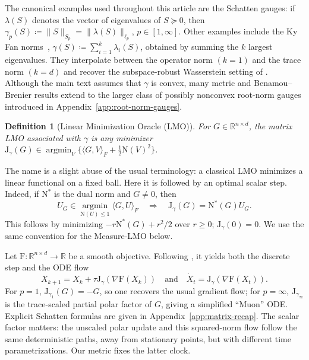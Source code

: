 \documentclass{article}
\newtheorem{definition}[theorem]{Definition}
\newcommand{\R}{\mathbb{R}}
\newcommand{\mF}{\mathrm{F}}
\newcommand{\mN}{\mathrm{N}}
\newcommand{\mJ}{\mathrm{J}}
\begin{document}
The canonical examples used throughout this article are the Schatten gauges: if $\lambda(S)$ denotes the vector of eigenvalues of $S\succeq 0$, then $\gamma_p(S)\coloneqq \|S\|_{S_p}=\|\lambda(S)\|_{\ell_p}$, $p\in[1,\infty]$.
%
Other examples include the Ky Fan norms~\citep{fan1951maximum},
$\gamma(S)\coloneqq \sum_{i=1}^k \lambda_i(S)$, obtained by summing the $k$
largest eigenvalues. They interpolate between the operator norm $(k=1)$ and
the trace norm $(k=d)$ and recover the subspace-robust Wasserstein setting of
\citet{PatyCuturi2019}. Although the main text assumes that $\gamma$ is convex,
many metric and Benamou--Brenier results extend to the larger class of possibly
nonconvex root-norm gauges introduced in
Appendix~\ref{app:root-norm-gauges}.


\begin{definition}[Linear Minimization Oracle (LMO)]
\label{def:matrix-lmo}
For $G\in\R^{n\times d}$, the matrix LMO associated with $\gamma$ is any minimizer
$\mJ_\gamma(G)\in\operatorname*{argmin}_{V}
\{\langle G,V\rangle_F+\frac12\mN(V)^2\}$.
\end{definition}

The name is a slight abuse of the usual terminology: a classical LMO minimizes
a linear functional on a fixed ball. Here it is followed by an optimal scalar
step. Indeed, if $\mN^*$ is the dual norm and $G\ne0$, then
\begin{equation}\label{eq:lmo-unit-ball}
 U_G\in\operatorname*{argmin}_{\mN(U)\le1}\langle G,U\rangle_F
 \quad\Longrightarrow\quad
 \mJ_\gamma(G)=\mN^*(G)U_G.
\end{equation}
This follows by minimizing $-r\mN^*(G)+r^2/2$ over $r\ge0$;
$\mJ_\gamma(0)=0$. We use the same convention for the Measure-LMO below.

Let $\mF:\R^{n\times d}\to\R$ be a smooth objective.
Following \citet{PethickXieAntonakopoulosEtAl2025}, it yields both the discrete step and the ODE flow
\begin{equation}\label{eq:ode-basic}
	X_{k+1}=X_k+\tau\mJ_\gamma(\nabla\mF(X_k))
	\quad\text{and}\quad
	\dot X_t=\mJ_\gamma(\nabla\mF(X_t)).
\end{equation}
For $p=1$, $\mJ_{\gamma_1}(G)=-G$, so one recovers the usual gradient flow;
for $p=\infty$, $\mJ_{\gamma_\infty}$ is the trace-scaled partial polar factor
of $G$, giving a simplified ``Muon'' ODE. Explicit Schatten formulas are
given in Appendix~\ref{app:matrix-recap}.
The scalar factor matters: the unscaled polar update and this squared-norm
flow follow the same deterministic paths, away from stationary points, but
with different time parametrizations. Our metric fixes the latter clock.
\end{document}
